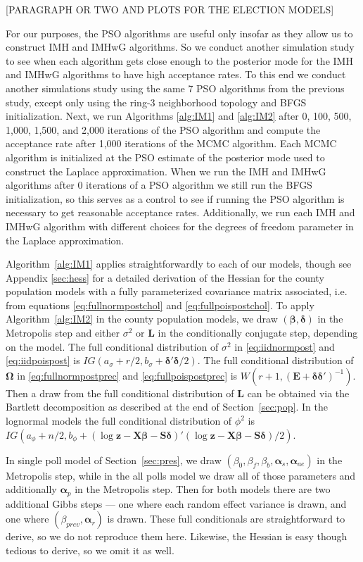 \documentclass[12pt]{article}
\begin{document}
[PARAGRAPH OR TWO AND PLOTS FOR THE ELECTION MODELS]

For our purposes, the PSO algorithms are useful only insofar as they allow us to construct IMH and IMHwG algorithms. So we conduct another simulation study to see when each algorithm gets close enough to the posterior mode for the IMH and IMHwG algorithms to have high acceptance rates. To this end we conduct another simulations study using the same 7 PSO algorithms from the previous study, except only using the ring-3 neighborhood topology and BFGS initialization. Next, we run Algorithms \ref{alg:IM1} and \ref{alg:IM2} after 0, 100, 500, 1,000, 1,500, and 2,000 iterations of the PSO algorithm and compute the acceptance rate after 1,000 iterations of the MCMC algorithm. Each MCMC algorithm is initialized at the PSO estimate of the posterior mode used to construct the Laplace approximation. When we run the IMH and IMHwG algorithms after 0 iterations of a PSO algorithm we still run the BFGS initialization, so this serves as a control to see if running the PSO algorithm is necessary to get reasonable acceptance rates. Additionally, we run each IMH and IMHwG algorithm with different choices for the degrees of freedom parameter in the Laplace approximation.

Algorithm~\ref{alg:IM1} applies straightforwardly to each of our models, though see Appendix \ref{sec:hess} for a detailed derivation of the Hessian for the county population models with a fully parameterized covariance matrix associated, i.e. from equations \eqref{eq:fullnormpostchol} and \eqref{eq:fullpoispostchol}. To apply Algorithm~\ref{alg:IM2} in the county population models, we draw $(\bm{\beta},\bm{\delta})$ in the Metropolis step and either $\sigma^2$ or $\bm{L}$ in the conditionally conjugate step, depending on the model. The full conditional distribution of $\sigma^2$ in \eqref{eq:iidnormpost} and \eqref{eq:iidpoispost} is $IG(a_{\sigma} + r/2, b_{\sigma} + \bm{\delta}'\bm{\delta}/2)$. The full conditional distribution of $\bm{\Omega}$ in \eqref{eq:fullnormpostprec} and \eqref{eq:fullpoispostprec} is $W(r + 1, (\bm{E} + \bm{\delta}\bm{\delta}')^{-1})$. Then a draw from the full conditional distribution of $\bm{L}$ can be obtained via the Bartlett decomposition as described at the end of Section~\ref{sec:pop}. In the lognormal models the full conditional distribution of $\phi^2$ is $IG(a_{\phi} + n/2, b_{\phi} + (\log \bm{z} - \bm{X}\bm{\beta} - \bm{S}\bm{\delta})'(\log \bm{z} - \bm{X}\bm{\beta} - \bm{S}\bm{\delta})/2)$. 

In single poll model of Section~\ref{sec:pres}, we draw $(\beta_0, \beta_f, \beta_b, \bm{\alpha}_{s}, \bm{\alpha}_{ae})$ in the Metropolis step, while in the all polls model we draw all of those parameters and additionally $\bm{\alpha}_p$ in the Metropolis step. Then for both models there are two additional Gibbs steps --- one where each random effect variance is drawn, and one where $(\beta_{prev}, \bm{\alpha}_r)$ is drawn. These full conditionals are straightforward to derive, so we do not reproduce them here. Likewise, the Hessian is easy though tedious to derive, so we omit it as well.
\end{document}
